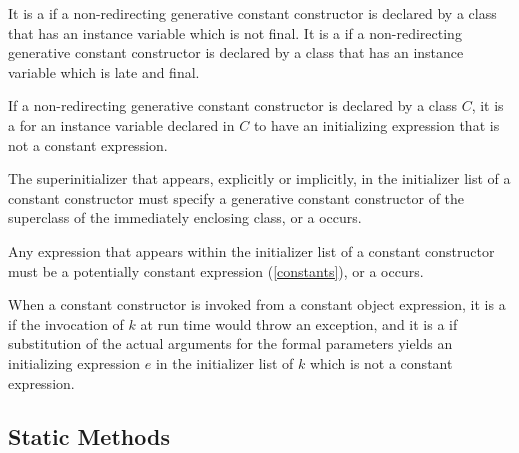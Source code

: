 \documentclass[makeidx]{article}
\begin{document}
\LMHash{}%
It is a
 if a non-redirecting generative constant constructor
is declared by a class that has an instance variable which is not final.
It is a
 if a non-redirecting generative constant constructor
is declared by a class that has an instance variable which is late and final.


\LMHash{}%
If a non-redirecting generative constant constructor 
is declared by a class $C$,
it is a 
for an instance variable declared in $C$
to have an initializing expression that is not a constant expression.


\LMHash{}%
The superinitializer that appears, explicitly or implicitly,
in the initializer list of a constant constructor
must specify a generative constant constructor of
the superclass of the immediately enclosing class,
or a  occurs.

\LMHash{}%
Any expression that appears within
the initializer list of a constant constructor
must be a potentially constant expression
(\ref{constants}),
or a  occurs.

\LMHash{}%
When a constant constructor  is invoked from
a constant object expression,
it is a  if
the invocation of $k$ at run time would throw an exception,
and it is a  if
substitution of the actual arguments for the formal parameters
yields an initializing expression $e$ in the initializer list of $k$
which is not a constant expression.



\subsection{Static Methods}
\end{document}
